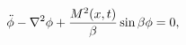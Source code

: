 \begin{equation}
\ddot{\phi} - \nabla^2 \phi + {M^2(x,t) \over \beta} \sin \beta \phi
 =0 \label{eq:phir},
\end{equation}

